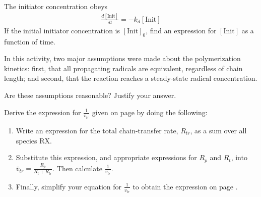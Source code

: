 \begin{activity}
\begin{ctqs}
		\begin{solution}[2.5in]
		\end{solution}
	
\end{ctqs}


\begin{exercises}

	\exercise The initiator concentration obeys
		\begin{align*}
			\frac{d[\text{Init}]}{dt} = -k_d[\text{Init}]
		\end{align*}
		If the initial initiator concentration is $[\text{Init}]_0$, find an expression for $[\text{Init}]$ as a function of time.
		
	\exercise In this activity, two major assumptions were made about the polymerization kinetics: first, that all propagating radicals are equivalent, regardless of chain length; and second, that the reaction reaches a steady-state radical concentration.
	
		Are these assumptions reasonable?  Justify your answer.
		
	\exercise Derive the expression for $\frac{1}{v_{tr}}$ given on page \pageref{\labelbase:info:vtr} by doing the following:
	
		\label{\labelbase:exc:chainxfer}
		
		\begin{enumerate}
			\item Write an expression for the total chain-transfer rate, $R_{tr}$, as a sum over all species RX.
			\item Substitute this expression, and appropriate expressions for $R_p$ and $R_t$, into $\bar v_{tr} = \frac{R_p}{R_t + R_{tr}}$.  Then calculate $\frac{1}{v_{tr}}$.
			\item Finally, simplify your equation for $\frac{1}{v_{tr}}$ to obtain the expression on page \pageref{\labelbase:info:vtr}.
		\end{enumerate}
		

%
	

\end{exercises}
\end{activity}

